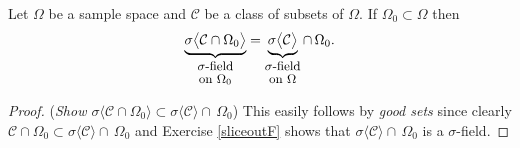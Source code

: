 \begin{theorem}
\label{restricTHM}
Let $\Omega$ be a sample space and  $\mathcal C$ be a class of subsets of $\Omega$.  If $\Omega_0\subset \Omega$ then
\[
\underbrace{\sigma\bigl\langle  \mathcal C \cap \Omega_0 \bigr\rangle}_{\shortstack{ \text{\small $\sigma$-field} \\ \text{\small on $\Omega_0$}}}= \underbrace{\sigma\bigl\langle \mathcal C \bigr\rangle}_{\shortstack{ \text{\small $\sigma$-field} \\ \text{\small on $\Omega$}}} \cap\, \Omega_0.
\]
\end{theorem}

\begin{proof}
({\sl Show $\sigma \langle  \mathcal C \cap \Omega_0 \rangle \subset \sigma \langle \mathcal C  \rangle \cap\, \Omega_0$}) This easily follows by {\it good sets}  since clearly $\mathcal C\cap \Omega_0\subset \sigma\langle \mathcal C\rangle\cap \,\Omega_0$ and  Exercise \ref{sliceoutF} shows that $\sigma \langle \mathcal C  \rangle \cap\, \Omega_0$ is a $\sigma$-field.


\end{proof}
